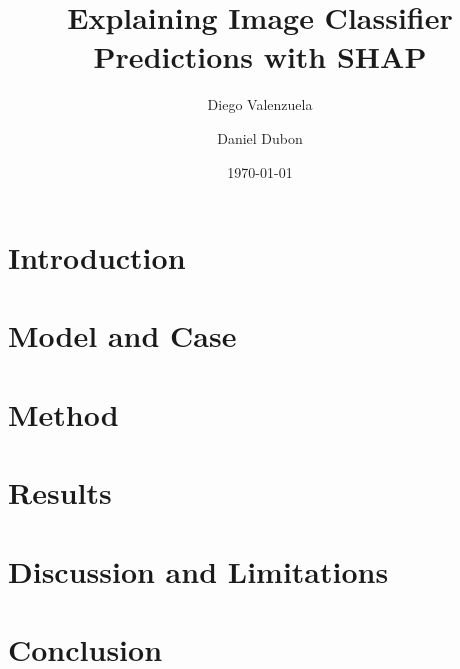 \documentclass[11pt]{article}
\title{Explaining Image Classifier Predictions with SHAP}
\author{Diego Valenzuela \and Daniel Dubon}
\date{\today}
\begin{document}
\maketitle

\begin{abstract}

\end{abstract}

\section{Introduction}


\section{Model and Case}


\section{Method}


\section{Results}


\section{Discussion and Limitations}


\section{Conclusion}




\end{document}
